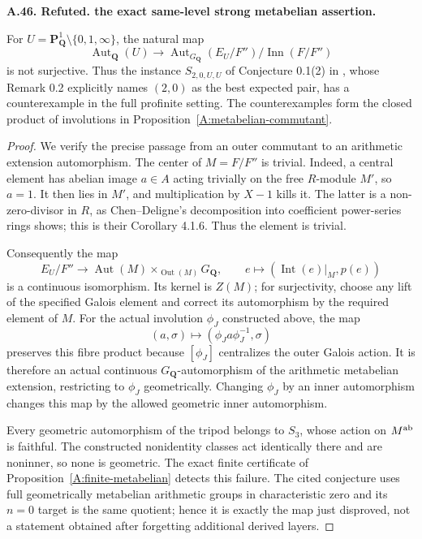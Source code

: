 \documentclass[11pt,oneside]{article}
\makeatletter
\newcounter{statementanchor}
\newenvironment{statement}[3]{%
 \refstepcounter{statementanchor}\def\@currentlabel{#1}%
 \par\addvspace{9pt}\noindent
 \textbf{#1. #2. #3.}\par\nobreak\noindent\ignorespaces
}{\par\addvspace{5pt}}
\makeatother
\begin{document}
\begin{statement}{A.46}{Refuted}{the exact same-level strong metabelian assertion}
\label{st:A.46}
\label{A:strong-metabelian-counterexample}
For $U=\mathbf P^1_{\mathbf Q}\setminus\{0,1,\infty\}$,
the natural map
\[
 \operatorname{Aut}_{\mathbf Q}(U)\longrightarrow
 \operatorname{Aut}_{G_{\mathbf Q}}(E_U/F'')/\operatorname{Inn}(F/F'')
\]
is not surjective. Thus the instance $S_{2,0,U,U}$ of
Conjecture 0.1(2) in \cite{A_Yamaguchi2024}, whose
Remark 0.2 explicitly names $(2,0)$ as the best expected
pair, has a counterexample in the full profinite setting.
The counterexamples form the closed product of involutions
in Proposition~\ref{A:metabelian-commutant}.
\end{statement}
\begin{proof}
We verify the precise passage from an outer commutant to an
arithmetic extension automorphism. The center of $M=F/F''$
is trivial. Indeed, a central element has abelian image
$a\in A$ acting trivially on the free $R$-module $M'$, so
$a=1$. It then lies in $M'$, and multiplication by $X-1$
kills it. The latter is a non-zero-divisor in $R$, as
Chen--Deligne's decomposition into coefficient power-series
rings shows; this is their Corollary 4.1.6. Thus the element
is trivial.

Consequently the map
\[
 E_U/F''\longrightarrow
 \operatorname{Aut}(M)\times_{\operatorname{Out}(M)}G_{\mathbf Q},
 \qquad e\longmapsto(\operatorname{Int}(e)|_M,p(e))
\]
is a continuous isomorphism. Its kernel is $Z(M)$; for
surjectivity, choose any lift of the specified Galois element
and correct its automorphism by the required element of $M$.
For the actual involution $\phi_J$ constructed above, the map
\[
             (a,\sigma)\longmapsto
                   (\phi_Ja\phi_J^{-1},\sigma)
\]
preserves this fibre product because $[\phi_J]$ centralizes
the outer Galois action. It is therefore an actual continuous
$G_{\mathbf Q}$-automorphism of the arithmetic metabelian
extension, restricting to $\phi_J$ geometrically. Changing
$\phi_J$ by an inner automorphism changes this map by the
allowed geometric inner automorphism.

Every geometric automorphism of the tripod belongs to $S_3$,
whose action on $M^{\rm ab}$ is faithful. The constructed
nonidentity classes act identically there and are noninner,
so none is geometric. The exact finite certificate of
Proposition~\ref{A:finite-metabelian} detects this failure.
The cited conjecture uses full geometrically metabelian
arithmetic groups in characteristic zero and its $n=0$
target is the same quotient; hence it is exactly the map
just disproved, not a statement obtained after forgetting
additional derived layers.
\end{proof}
\end{document}
